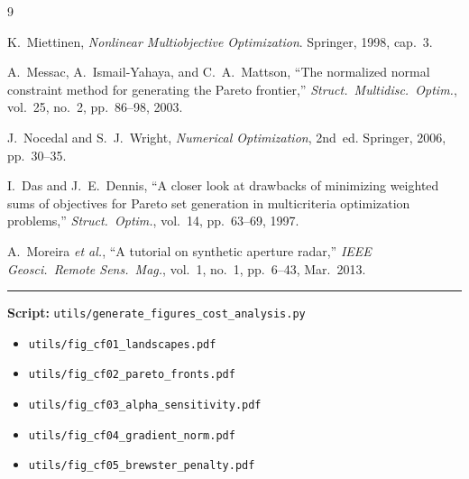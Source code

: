 \documentclass[11pt, a4paper]{article}
\begin{document}
\begin{thebibliography}{9}

K.~Miettinen,
\textit{Nonlinear Multiobjective Optimization}.
Springer, 1998, cap.~3.

A.~Messac, A.~Ismail-Yahaya, and C.~A.~Mattson,
``The normalized normal constraint method for generating the Pareto frontier,''
\textit{Struct.\ Multidisc.\ Optim.}, vol.~25, no.~2, pp.~86--98, 2003.

J.~Nocedal and S.~J.~Wright,
\textit{Numerical Optimization}, 2nd~ed.
Springer, 2006, pp.~30--35.

I.~Das and J.~E.~Dennis,
``A closer look at drawbacks of minimizing weighted sums of objectives
for Pareto set generation in multicriteria optimization problems,''
\textit{Struct.\ Optim.}, vol.~14, pp.~63--69, 1997.

A.~Moreira \textit{et al.},
``A tutorial on synthetic aperture radar,''
\textit{IEEE Geosci.\ Remote Sens.\ Mag.}, vol.~1, no.~1, pp.~6--43, Mar.~2013.

\end{thebibliography}

\bigskip
\noindent\rule{\linewidth}{0.4pt}

\noindent\small
\textbf{Script:} \texttt{utils/generate\_figures\_cost\_analysis.py}
\begin{itemize}[noitemsep, topsep=2pt, leftmargin=1.5em]
  \item[] \texttt{utils/fig\_cf01\_landscapes.pdf}
  \item[] \texttt{utils/fig\_cf02\_pareto\_fronts.pdf}
  \item[] \texttt{utils/fig\_cf03\_alpha\_sensitivity.pdf}
  \item[] \texttt{utils/fig\_cf04\_gradient\_norm.pdf}
  \item[] \texttt{utils/fig\_cf05\_brewster\_penalty.pdf}
\end{itemize}
\end{document}

